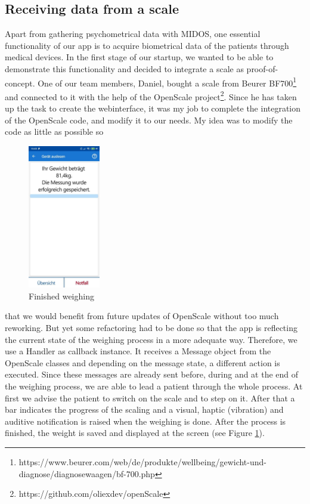 \subsection{Receiving data from a scale}
Apart from gathering psychometrical data with MIDOS, one essential functionality of our app is to acquire biometrical data of the patients through medical devices. In the first stage of our startup, we wanted to be able to demonstrate this functionality and decided to integrate a scale as proof-of-concept. One of our team members, Daniel, bought a scale from Beurer BF700\footnote{https://www.beurer.com/web/de/produkte/wellbeing/gewicht-und-diagnose/diagnosewaagen/bf-700.php} and connected to it with the help of the OpenScale project\footnote{https://github.com/oliexdev/openScale}. Since he  has taken up the task to create the webinterface, it was my job to complete the integration of the OpenScale code, and modify it to our needs. My idea was to modify the code as little as possible so 

\begin{figure}
\vspace{-30pt}
  \begin{center}
    \includegraphics[width=0.28\textwidth]{figures/KlausScale.jpg}
  \end{center}
  \caption{Finished weighing}
  \label{fig:scale}
  \vspace{-10pt}
\end{figure}

that we would benefit from future updates of OpenScale without too much reworking. But yet some refactoring had to be done so that the app is reflecting the current state of the weighing process in a more adequate way. Therefore, we use a Handler as callback instance. It receives a Message object from the OpenScale classes and depending on the message state, a different action is executed. Since these messages are already sent before, during and at the end of the weighing process, we are able to lead a patient through the whole process. At first we advise the patient to switch on the scale and to step on it. After that a bar indicates the progress of the scaling and a visual, haptic (vibration) and auditive notification is raised when the weighing is done. After the process is finished, the weight is saved and displayed at the screen (see Figure \ref{fig:scale}). 